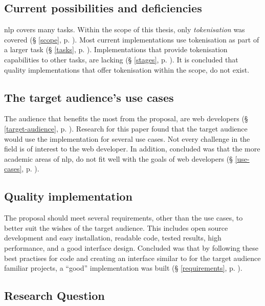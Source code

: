 \subsection{Current possibilities and
  deficiencies}\label{q-current-possibilities-and-deficientcies}

\gls{nlp} covers many tasks.
Within the scope of this thesis, only \emph{tokenisation} was covered
  (§ \ref{scope}, p. \pageref{scope}).
Most current implementations use tokenisation as part of a larger task
  (§ \ref{tasks}, p. \pageref{tasks}).
Implementations that provide tokenisation capabilities to other tasks,
  are lacking (§ \ref{stages}, p. \pageref{stages}).
It is concluded that quality implementations that offer tokenisation within
  the scope, do not exist.

\subsection{The target audience's use cases}\label{q-use-cases}

The audience that benefits the most from the proposal, are web developers
  (§ \ref{target-audience}, p. \pageref{target-audience}).
Research for this paper found that the target audience would use the
  implementation for several use cases.
Not every challenge in the field is of interest to the web developer.
In addition, concluded was that the more academic areas of \gls{nlp}, do not
  fit well with the goals of web developers (§ \ref{use-cases},
  p. \pageref{use-cases}).

\subsection{Quality implementation}\label{q-quality-implementation}

The proposal should meet several requirements, other than the use cases,
  to better suit the wishes of the target audience.
This includes open source development and easy installation, readable code,
  tested results, high performance, and a good interface design.
Concluded was that by following these best practises for code and creating
  an interface similar to for the target audience familiar projects, a
  ``good'' implementation was built (§ \ref{requirements},
  p. \pageref{requirements}).

\subsection{Research Question}\label{q-research-question}

